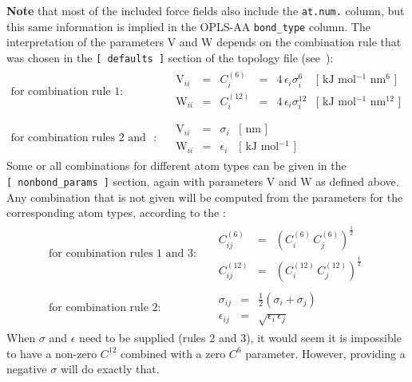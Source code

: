 {\bf Note} that most of the included force fields also include the {\tt at.num.} column, 
but this same information is implied in the OPLS-AA {\tt bond_type} column.
The interpretation of the parameters V and W depends on the combination rule 
that was chosen in the {\tt [~defaults~]} section of the topology file 
(see~):
\begin{eqnarray}
\mbox{for combination rule 1}: & &
\begin{array}{llllll}
  \mbox{V}_{ii} & = & C^{(6)}_{i}  & = & 4\,\epsilon_i\sigma_i^{6} &
  \mbox{[ kJ mol$^{-1}$ nm$^{6}$ ]}\\
  \mbox{W}_{ii} & = & C^{(12)}_{i} & = & 4\,\epsilon_i\sigma_i^{12} &
  \mbox{[ kJ mol$^{-1}$ nm$^{12}$ ]}\\
\end{array}
\\
\mbox{for combination rules 2 and 3}: & &
\begin{array}{llll}
  \mbox{V}_{ii} & = & \sigma_i   & \mbox{[ nm ]} \\
  \mbox{W}_{ii} & = & \epsilon_i & \mbox{[ kJ mol$^{-1}$ ]}
\end{array}
\end{eqnarray}
Some or all combinations for different atom types can be given in the 
{\tt [~nonbond_params~]} section, again with parameters V and W as defined 
above. Any combination that is not given will be computed from the parameters 
for the corresponding atom types, according to the :
\begin{eqnarray}
\mbox{for combination rules 1 and 3}: & &
\begin{array}{lll}
  C^{(6)}_{ij}  & = & \left(C^{(6)}_i\,C^{(6)}_j\right)^{\frac{1}{2}} \\
  C^{(12)}_{ij} & = & \left(C^{(12)}_i\,C^{(12)}_j\right)^{\frac{1}{2}}
\end{array}
\\
\mbox{for combination rule 2}: & &
\begin{array}{lll}
  \sigma_{ij}   & = & \frac{1}{2}(\sigma_i+\sigma_j) \\
  \epsilon_{ij} & = & \sqrt{\epsilon_i\,\epsilon_j}
\end{array}
\end{eqnarray}
When $\sigma$ and $\epsilon$ need to be supplied (rules 2 and 3),
it would seem it is impossible to have a non-zero $C^{12}$ combined
with a zero $C^6$ parameter. However, providing a negative $\sigma$
will do exactly that.

